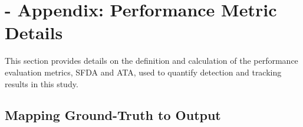 \documentclass{article}
\begin{document}





\section{-  Appendix: Performance Metric Details}
\label{sec:performancemetricdetails}
This section provides details on the definition and calculation of the performance evaluation metrics, SFDA and ATA, used to quantify detection and tracking results in this study.

\subsection{Mapping Ground-Truth to Output}
\label{sec:mappingtoground}
\end{document}
